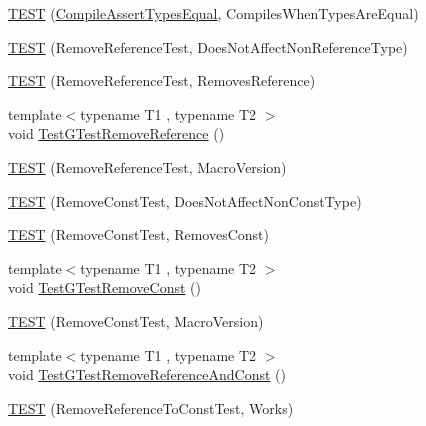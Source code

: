 \begin{DoxyCompactItemize}
\mbox{\hyperlink{googletest-master_2googletest_2test_2gtest__unittest_8cc_aae9a7c282222598d5d254cf470c9a45b}{T\+E\+ST}} (\mbox{\hyperlink{structtesting_1_1internal_1_1_compile_assert_types_equal}{Compile\+Assert\+Types\+Equal}}, Compiles\+When\+Types\+Are\+Equal)
\item 
\mbox{\hyperlink{googletest-master_2googletest_2test_2gtest__unittest_8cc_a3a7ab4954eeaf0889269b56ca3df558e}{T\+E\+ST}} (Remove\+Reference\+Test, Does\+Not\+Affect\+Non\+Reference\+Type)
\item 
\mbox{\hyperlink{googletest-master_2googletest_2test_2gtest__unittest_8cc_ae15336b18be29c1317624a2ffdb74530}{T\+E\+ST}} (Remove\+Reference\+Test, Removes\+Reference)
\item 
{\footnotesize template$<$typename T1 , typename T2 $>$ }\\void \mbox{\hyperlink{googletest-master_2googletest_2test_2gtest__unittest_8cc_adb1f904a1a5761796ac803fdf4f203a5}{Test\+G\+Test\+Remove\+Reference}} ()
\item 
\mbox{\hyperlink{googletest-master_2googletest_2test_2gtest__unittest_8cc_a742fff74857242801058ef6d192b1910}{T\+E\+ST}} (Remove\+Reference\+Test, Macro\+Version)
\item 
\mbox{\hyperlink{googletest-master_2googletest_2test_2gtest__unittest_8cc_a553d6725457e4b4e9d89d60f0cc58470}{T\+E\+ST}} (Remove\+Const\+Test, Does\+Not\+Affect\+Non\+Const\+Type)
\item 
\mbox{\hyperlink{googletest-master_2googletest_2test_2gtest__unittest_8cc_aa9be3d92628cb49887909ae2c75a231b}{T\+E\+ST}} (Remove\+Const\+Test, Removes\+Const)
\item 
{\footnotesize template$<$typename T1 , typename T2 $>$ }\\void \mbox{\hyperlink{googletest-master_2googletest_2test_2gtest__unittest_8cc_a925cffc2731cce684bfcd82858eac00b}{Test\+G\+Test\+Remove\+Const}} ()
\item 
\mbox{\hyperlink{googletest-master_2googletest_2test_2gtest__unittest_8cc_a9fd89b0957e416c98f52e2c44196bb29}{T\+E\+ST}} (Remove\+Const\+Test, Macro\+Version)
\item 
{\footnotesize template$<$typename T1 , typename T2 $>$ }\\void \mbox{\hyperlink{googletest-master_2googletest_2test_2gtest__unittest_8cc_af4e9d28ffb149f2bce37f0883cece0ba}{Test\+G\+Test\+Remove\+Reference\+And\+Const}} ()
\item 
\mbox{\hyperlink{googletest-master_2googletest_2test_2gtest__unittest_8cc_af57c5701311c2e9074540ee680e3f34e}{T\+E\+ST}} (Remove\+Reference\+To\+Const\+Test, Works)

\end{DoxyCompactItemize}
